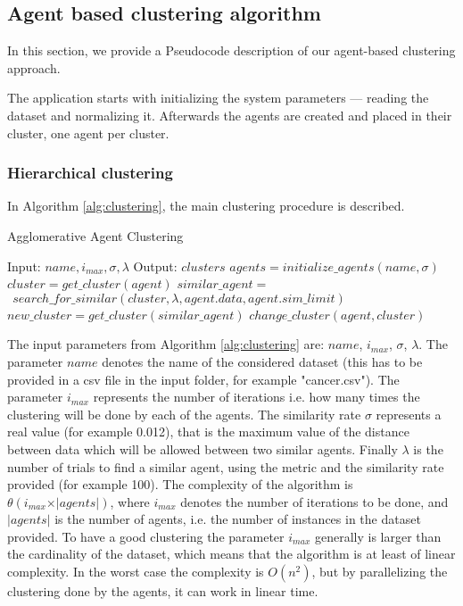\documentclass[conference]{IEEEtran}
\begin{document}
\subsection{Agent based clustering algorithm}
\label{clustering algorithm}

In this section, we provide a Pseudocode description of our agent-based clustering approach.

The application starts with initializing the system parameters --- reading the dataset and normalizing it. Afterwards the agents are created and placed in their cluster, one agent per cluster.

\subsubsection{Hierarchical clustering}

In Algorithm \ref{alg:clustering}, the main clustering procedure is described.

\scriptsize
\begin{algorithm}
\caption{Agglomerative Agent Clustering}
\label{alg:clustering}
\begin{algorithmic}[1]
\STATE Input: $name, i_{max}, \sigma, \lambda$
\STATE Output: $clusters$
\STATE $agents = initialize{\_}agents(name, \sigma)$
		\STATE $cluster = get{\_}cluster(agent)$
		\STATE $similar{\_}agent = $
		\STATE $~ 	~search{\_}for{\_}similar(cluster, \lambda, agent.data, agent.sim{\_}limit)$
			\STATE $new{\_}cluster = get{\_}cluster(similar{\_}agent)$
			\STATE $change{\_}cluster(agent, cluster)$
		\ENDIF
	\ENDFOR
\ENDFOR
\end{algorithmic}
\end{algorithm}
\normalsize

The input parameters from Algorithm \ref{alg:clustering} are: $name$, $i_{max}$, $\sigma$, $\lambda$. The parameter $name$ denotes the name of the considered dataset (this has to be provided in a csv file in the input folder, for example "cancer.csv"). The parameter $i_{max}$ represents the number of iterations i.e. how many times the clustering will be done by each of the agents. The similarity rate $\sigma$ represents a real value (for example 0.012), that is the maximum value of the distance between data which will be allowed between two similar agents. Finally $\lambda$ is the number of trials to find a similar agent, using the metric and the similarity rate provided (for example 100).
The complexity of the algorithm is $\theta(i_{max} \times \vert agents \vert)$, where $i_{max}$ denotes the number of iterations to be done, and $\vert agents \vert$ is the number of agents, i.e. the number of instances in the dataset provided. To have a good clustering the parameter $i_{max}$ generally is larger than the cardinality of the dataset, which means that the algorithm is at least of linear complexity. In the worst case the complexity is $O(n^{2})$, but by parallelizing the clustering done by the agents, it can work in linear time.
\end{document}

